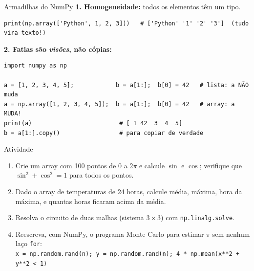 \documentclass[aspectratio=169,10pt,t]{beamer}
\begin{document}
\begin{frame}[fragile]{Armadilhas do NumPy}
  \textbf{1. Homogeneidade:} todos os elementos têm um tipo.
\begin{lstlisting}
print(np.array(['Python', 1, 2, 3]))   # ['Python' '1' '2' '3']  (tudo vira texto!)
\end{lstlisting}
  \textbf{2. Fatias são \emph{visões}, não cópias:}
\begin{lstlisting}
import numpy as np

a = [1, 2, 3, 4, 5];            b = a[1:];  b[0] = 42   # lista: a NÃO muda
a = np.array([1, 2, 3, 4, 5]);  b = a[1:];  b[0] = 42   # array: a MUDA!
print(a)                         # [ 1 42  3  4  5]
b = a[1:].copy()                 # para copiar de verdade
\end{lstlisting}
\end{frame}

\begin{frame}{Atividade}
  \begin{enumerate}
    \item Crie um array com 100 pontos de \(0\) a \(2\pi\) e calcule \(\sin\) e \(\cos\); verifique que \(\sin^2+\cos^2=1\) para todos os pontos.
    \item Dado o array de temperaturas de 24 horas, calcule média, máxima, hora da máxima, e quantas horas ficaram acima da média.
    \item Resolva o circuito de duas malhas (sistema \(3\times3\)) com \texttt{np.linalg.solve}.
    \item Reescreva, com NumPy, o programa Monte Carlo para estimar \(\pi\) sem nenhum laço \texttt{for}:\\
          \texttt{x = np.random.rand(n); y = np.random.rand(n); 4 * np.mean(x**2 + y**2 < 1)}
  \end{enumerate}
\end{frame}


\end{document}
